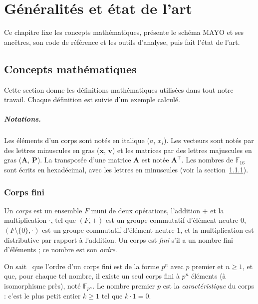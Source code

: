 \chapter[Généralités et état de l'art]{Généralités et état de l'art}
\label{ch:etat}

Ce chapitre fixe les concepts mathématiques, présente le schéma MAYO et ses ancêtres, son code de référence et les outils d'analyse, puis fait l'état de l'art.

\section{Concepts mathématiques}\label{sec:maths}
Cette section donne les définitions mathématiques utilisées dans tout notre travail. Chaque définition est suivie d'un exemple calculé.

\paragraph{Notations.} Les éléments d'un corps sont notés en italique ($a$, $x_i$). Les vecteurs sont notés par des lettres minuscules en gras ($\mathbf{x}$, $\mathbf{v}$) et les matrices par des lettres majuscules en gras ($\mathbf{A}$, $\mathbf{P}$). La transposée d'une matrice $\mathbf{A}$ est notée $\mathbf{A}^{\top}$. Les nombres de $\mathbb{F}_{16}$ sont écrits en hexadécimal, avec les lettres en minuscules (voir la section~\ref{sec:corps}).

\subsection{Corps fini}\label{sec:corps}
\begin{definition}
Un \emph{corps} est un ensemble $F$ muni de deux opérations, l'addition $+$ et la multiplication $\cdot$, tel que $(F,+)$ est un groupe commutatif d'élément neutre $0$, $(F\setminus\{0\},\cdot)$ est un groupe commutatif d'élément neutre $1$, et la multiplication est distributive par rapport à l'addition. Un corps est \emph{fini} s'il a un nombre fini d'éléments ; ce nombre est son \emph{ordre}.
\end{definition}
On sait~\cite{lidl} que l'ordre d'un corps fini est de la forme $p^n$ avec $p$ premier et $n\ge1$, et que, pour chaque tel nombre, il existe un seul corps fini à $p^n$ éléments (à isomorphisme près), noté $\mathbb{F}_{p^n}$. Le nombre premier $p$ est la \emph{caractéristique} du corps : c'est le plus petit entier $k\ge1$ tel que $k\cdot1=0$.

